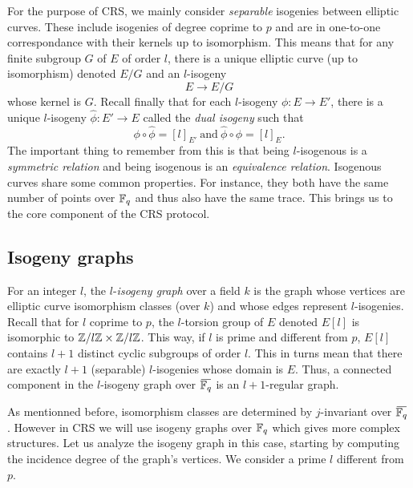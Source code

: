 \documentclass[../main/main.tex]{subfiles}
\begin{document}
For the purpose of CRS, we mainly consider \textit{separable} isogenies between elliptic curves.
These include isogenies of degree coprime to $p$ and are in one-to-one correspondance with their kernels up to isomorphism.
This means that for any finite subgroup $G$ of $E$ of order $l$, there is a unique elliptic curve (up to isomorphism) denoted $E/G$ and an $l$-isogeny
\[
	E\rightarrow E/G
\]
whose kernel is $G$.
Recall finally that for each $l$-isogeny $\phi:E\rightarrow E'$, there is a unique $l$-isogeny $\hat{\phi}:E'\rightarrow E$ called the \textit{dual isogeny} such that
\[
	\phi \circ \hat{\phi} = [l]_{E'} \ \text{and} \ \hat{\phi} \circ \phi = [l]_{E}.
\]
The important thing to remember from this is that being $l$-isogenous is a \textit{symmetric relation} and being isogenous is an \textit{equivalence relation}.
Isogenous curves share some common properties.
For instance, they both have the same number of points over $\mathbb{F}_q$ and thus also have the same trace.
This brings us to the core component of the CRS protocol.

\subsection{Isogeny graphs}
For an integer $l$, the $l$-\textit{isogeny graph} over a field $k$ is the graph whose vertices are elliptic curve isomorphism classes (over $k$) and whose edges represent $l$-isogenies.
Recall that for $l$ coprime to $p$, the $l$-torsion group of $E$ denoted $E[l]$ is isomorphic to $\mathbb{Z}/l\mathbb{Z}\times\mathbb{Z}/l\mathbb{Z}$.
This way, if $l$ is prime and different from $p$, $E[l]$ contains $l+1$ distinct cyclic subgroups of order $l$.
This in turns mean that there are exactly $l+1$ (separable) $l$-isogenies whose domain is $E$.
Thus, a connected component in the $l$-isogeny graph over $\overbar{\FFq}$ is an $l+1$-regular graph.

As mentionned before, isomorphism classes are determined by $j$-invariant over $\overbar{\FFq}$.
However in CRS we will use isogeny graphs over $\mathbb{F}_q$ which gives more complex structures.
Let us analyze the isogeny graph in this case, starting by computing the incidence degree of the graph's vertices.
We consider a prime $l$ different from $p$.
\end{document}
